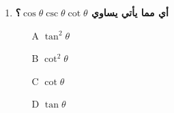 \documentclass{article}
\begin{document}
\begin{enumerate}
\item \textbf{أي مما يأتي يساوي $\cos\theta \csc\theta \cot\theta$؟}
\begin{enumerate}
    \item[A] $\tan^2\theta$
    \item[B] $\cot^2\theta$
    \item[C] $\cot\theta$
    \item[D] $\tan\theta$
\end{enumerate}
\end{enumerate}
\end{document}
